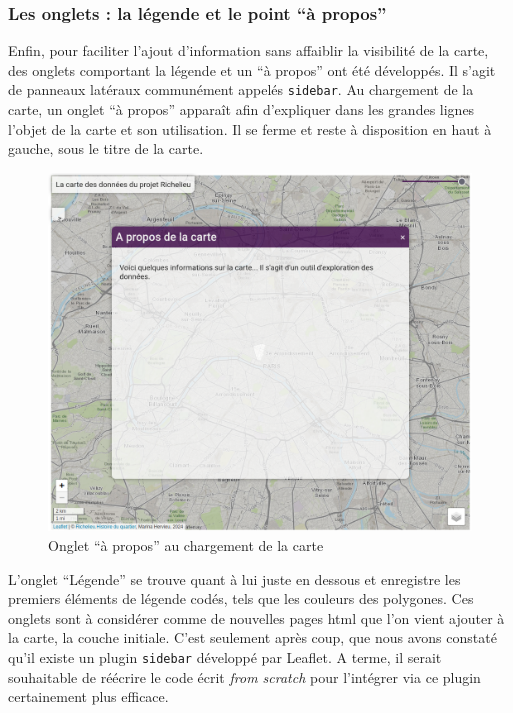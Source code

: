 \subsubsection{Les onglets : la légende et le point \enquote{à propos}}
Enfin, pour faciliter l'ajout d'information sans affaiblir la visibilité de la carte, des onglets comportant la légende et un \enquote{à propos} ont été développés. Il s'agit de panneaux latéraux communément appelés \texttt{sidebar}. 
Au chargement de la carte, un onglet \enquote{à propos} apparaît afin d'expliquer dans les grandes lignes l'objet de la carte et son utilisation. Il se ferme et reste à disposition en haut à gauche, sous le titre de la carte. 
\begin{figure}[h!]
    \centering
    \includegraphics[width=0.75\linewidth]{images/a-propos.png}
    \caption{Onglet \enquote{à propos} au chargement de la carte}
    \label{fig:a-propos}
\end{figure}

L'onglet \enquote{Légende} se trouve quant à lui juste en dessous et enregistre les premiers éléments de légende codés, tels que les couleurs des polygones. Ces onglets sont à considérer comme de nouvelles pages \acrshort{html} que l'on vient ajouter à la carte, la couche initiale. C'est seulement après coup, que nous avons constaté qu'il existe un plugin \texttt{sidebar} développé par Leaflet. A terme, il serait souhaitable de réécrire le code écrit \textit{from scratch} pour l'intégrer via ce plugin certainement plus efficace. 

